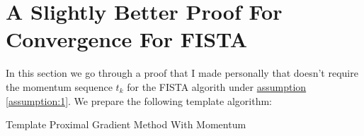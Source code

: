 \documentclass[]{article}
\theoremstyle{definition}
\begin{document}

\section{A Slightly Better Proof For Convergence For FISTA}
    In this section we go through a proof that I made personally that doesn't require the momentum sequence $t_k$ for the FISTA algorith under \hyperref[assumption:1]{assumption \ref*{assumption:1}}. We prepare the following template algorithm: 
    \begin{algorithm}
        \begin{algorithmic}[1]
            \ENDFOR
        \end{algorithmic}
        \caption{Template Proximal Gradient Method With Momentum}\label{alg:fista_template}
    \end{algorithm}
\end{document}
